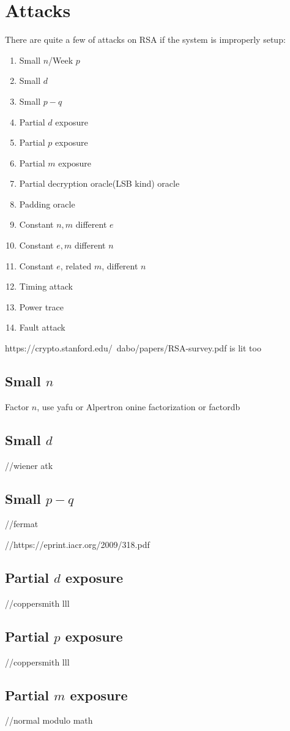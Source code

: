 \documentclass{report}
\begin{document}
\section{Attacks}
There are quite a few of attacks on RSA if the system is improperly setup:
\begin{enumerate}
	\item Small $n$/Week $p$
	\item Small $d$
	\item Small $p-q$
	\item Partial $d$ exposure
	\item Partial $p$ exposure
	\item Partial $m$ exposure
	\item Partial decryption oracle(LSB kind) oracle
	\item Padding oracle
	\item Constant $n,m$ different $e$
	\item Constant $e,m$ different $n$
	\item Constant $e$, related $m$, different $n$
	\item Timing attack
	\item Power trace
	\item Fault attack
\end{enumerate}
https://crypto.stanford.edu/~dabo/papers/RSA-survey.pdf is lit too
\subsection{Small $n$}
Factor $n$, use yafu or  Alpertron onine factorization or factordb
\subsection{Small $d$}
//wiener atk
\subsection{Small $p-q$}
//fermat

//https://eprint.iacr.org/2009/318.pdf
\subsection{Partial $d$ exposure}
//coppersmith lll
\subsection{Partial $p$ exposure}
//coppersmith lll
\subsection{Partial $m$ exposure}
//normal modulo math
\end{document}
